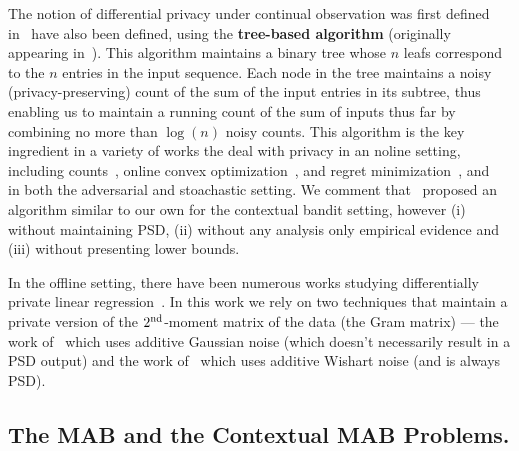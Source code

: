 \documentclass{article}
\begin{document}
The notion of differential privacy under continual observation was first defined in~\cite{DworkContinualObservation2010} have also been defined, using the \textbf{tree-based algorithm} (originally appearing in~\cite{ChanPrivateContinualRelease2010}). This algorithm maintains a binary tree whose $n$ leafs correspond to the $n$ entries in the input sequence. Each node in the tree maintains a noisy (privacy-preserving) count of the sum of the input entries in its subtree, thus enabling us to maintain a running count of the sum of inputs thus far by combining no more than $\log(n)$ noisy counts. This algorithm is the key ingredient in a variety of works the deal with privacy in an noline setting, including counts~\cite{DworkContinualObservation2010}, online convex optimization~\cite{Jain,someone,thakurta,colt2012/3}, and regret minimization~\cite{SmithThakurta2013},\cite{MishraNearlyOptimalDPBandits2015} and~\cite{TussouDimitrikakis twice} in both the adversarial and stoachastic setting. We comment that~\cite{MishraNearlyOptimalDPBandits2015} proposed an algorithm similar to our own for the contextual bandit setting, however (i) without maintaining PSD, (ii) without any analysis only empirical evidence and (iii) without presenting lower bounds.

In the offline setting, there have been numerous works studying differentially private linear regression~\cite{ChaudhuriMonteleoniSarwate2011, BassilySmithThakurta2014}. In this work we rely on two techniques that maintain a private version of the $2^{\rm nd}$-moment matrix of the data (the Gram matrix) --- the work of~\cite{DworkTTZ14} which uses additive Gaussian noise (which doesn't necessarily result in a PSD output) and the work of~\cite{SheffetPrivateApproxRegression2015} which uses additive Wishart noise (and is always PSD).

\subsection{The MAB and the Contextual MAB Problems.}
\end{document}
